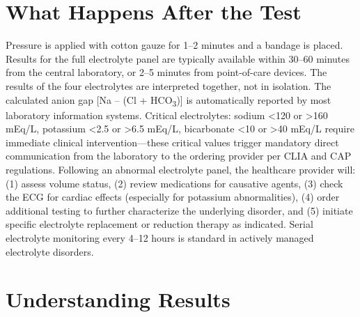 \section*{What Happens After the Test}
Pressure is applied with cotton gauze for 1--2 minutes and a bandage is placed. Results for the full electrolyte panel are typically available within 30--60 minutes from the central laboratory, or 2--5 minutes from point-of-care devices. The results of the four electrolytes are interpreted together, not in isolation. The calculated anion gap [Na -- (Cl + HCO\textsubscript{3})] is automatically reported by most laboratory information systems. Critical electrolytes: sodium <120 or >160 mEq/L, potassium <2.5 or >6.5 mEq/L, bicarbonate <10 or >40 mEq/L require immediate clinical intervention---these critical values trigger mandatory direct communication from the laboratory to the ordering provider per CLIA and CAP regulations. Following an abnormal electrolyte panel, the healthcare provider will: (1) assess volume status, (2) review medications for causative agents, (3) check the ECG for cardiac effects (especially for potassium abnormalities), (4) order additional testing to further characterize the underlying disorder, and (5) initiate specific electrolyte replacement or reduction therapy as indicated. Serial electrolyte monitoring every 4--12 hours is standard in actively managed electrolyte disorders.

\section*{Understanding Results}


